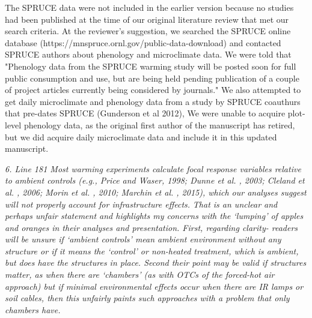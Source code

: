 \documentclass[11pt,a4paper]{letter}
\begin{document}
\par The SPRUCE data were not included in the earlier version because no studies had been published at the time of our original literature review that met our search criteria.  At the reviewer's suggestion, we searched the SPRUCE online database (https://mnspruce.ornl.gov/public-data-download) and contacted SPRUCE authors about phenology and microclimate data. We were told that "Phenology data from the SPRUCE warming study will be posted soon for full public consumption and use, but are being held pending publication of a couple of project articles currently being considered by journals." We also attempted to get daily microclimate and phenology data from a study by SPRUCE coauthurs that pre-dates SPRUCE (Gunderson et al 2012), We were unable to acquire plot-level phenology data, as the original first author of the manuscript has retired, but we did acquire daily microclimate data and include it in this updated manuscript.
\\
\par \emph{6. Line 181 Most warming experiments calculate focal response variables relative to ambient controls (e.g., Price and Waser, 1998; Dunne et al. , 2003; Cleland et al. , 2006; Morin et al. , 2010; Marchin et al. , 2015), which our analyses suggest will not properly account for infrastructure effects.}
\emph{That is an unclear and perhaps unfair statement and highlights my concerns with the `lumping' of apples and oranges in their analyses and presentation. First, regarding clarity- readers will be unsure if `ambient controls' mean ambient environment without any structure or if it means the `control' or non-heated treatment, which is ambient, but does have the structures in place. Second their point may be valid if structures matter, as when there are `chambers' (as with OTCs of the forced-hot air approach) but if minimal environmental effects occur when there are IR lamps or soil cables, then this unfairly paints such approaches with a problem that only chambers have.}
\end{document}
